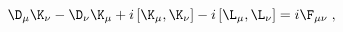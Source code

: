 \begin{equation}
  \label{eq:Kherm}
  \D_\mu\K_\nu-  \D_\nu\K_\mu + i\left[\K_\mu ,\K_\nu\right]-i \left[\L_\mu ,\L_\nu\right] =
  i\F_{\mu\nu} \; ,
\end{equation}

